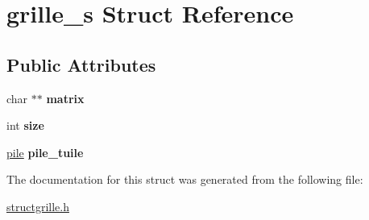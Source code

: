 \hypertarget{structgrille__s}{}\section{grille\+\_\+s Struct Reference}
\label{structgrille__s}
\subsection*{Public Attributes}
\begin{DoxyCompactItemize}
\item 
char $\ast$$\ast$ {\bfseries matrix}\hypertarget{structgrille__s_adb7d4c3b09d1835a386ec6791a251188}{}\label{structgrille__s_adb7d4c3b09d1835a386ec6791a251188}

\item 
int {\bfseries size}\hypertarget{structgrille__s_a85828f7ea1b281e59c963796a4730430}{}\label{structgrille__s_a85828f7ea1b281e59c963796a4730430}

\item 
\hyperlink{structpile}{pile} {\bfseries pile\+\_\+tuile}\hypertarget{structgrille__s_a495594923d26abd395bd749ee37946b7}{}\label{structgrille__s_a495594923d26abd395bd749ee37946b7}

\end{DoxyCompactItemize}


The documentation for this struct was generated from the following file\+:\begin{DoxyCompactItemize}
\item 
\hyperlink{structgrille_8h}{structgrille.\+h}\end{DoxyCompactItemize}
